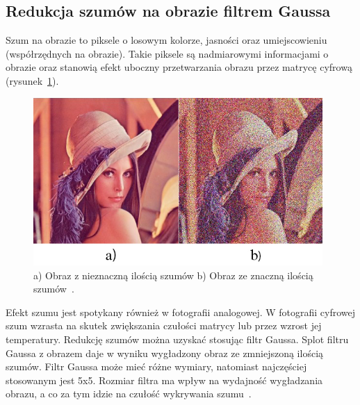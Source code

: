 \documentclass[a4paper,twoside,12pt]{book}
\begin{document}
    \subsection{Redukcja szumów na obrazie filtrem Gaussa}\label{subsec:redukcja-szumów-na-obrazie-filtrem-gaussa}
    Szum na obrazie to piksele o losowym kolorze, jasności oraz umiejscowieniu (współrzędnych na obrazie).
    Takie piksele są nadmiarowymi informacjami o obrazie oraz stanowią efekt uboczny przetwarzania obrazu
    przez matrycę cyfrową (rysunek~\ref{fig.lenkaSzumy}).

    \begin{figure}[h!]
        \centering
        \includegraphics[width=11cm]{Obrazy/lenkaSzumy.jpg}
        \caption{a) Obraz z nieznaczną ilością szumów b) Obraz ze znaczną ilością szumów~\cite{lenkaSzumy}.}
        \label{fig.lenkaSzumy}
    \end{figure}

    Efekt szumu jest spotykany również w fotografii analogowej.
    W fotografii cyfrowej szum wzrasta na skutek zwiększania czułości matrycy lub przez wzrost jej temperatury.
    Redukcję szumów można uzyskać stosując filtr Gaussa.
    Splot filtru Gaussa z obrazem daje w wyniku wygładzony obraz ze zmniejszoną ilością szumów.
    Filtr Gaussa może mieć różne wymiary, natomiast
    najczęściej stosowanym jest 5x5.
    Rozmiar filtra ma wpływ na wydajność wygładzania obrazu, a co za tym idzie na czułość wykrywania szumu~\cite{Canny}.
\end{document}
